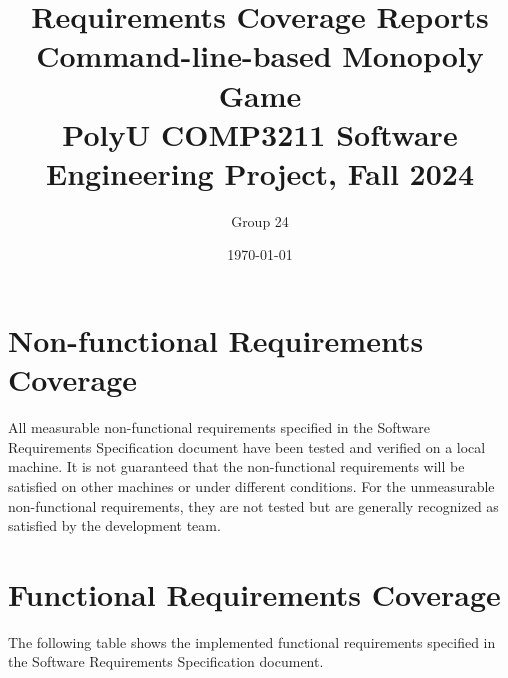 \documentclass{article}
\title{\textbf{Requirements Coverage Reports} \\ {\textbf{Command-line-based Monopoly Game}}\\ {\large PolyU COMP3211 Software Engineering Project, Fall 2024}}
\author{\large Group 24}
\date{\today}
\begin{document}
\maketitle{}

\section{Non-functional Requirements Coverage}

All measurable non-functional requirements specified in the Software Requirements Specification document have been tested and verified on a local machine.
It is not guaranteed that the non-functional requirements will be satisfied on other machines or under different conditions.
For the unmeasurable non-functional requirements, they are not tested but are generally recognized as satisfied by the development team.

\section{Functional Requirements Coverage}

The following table shows the implemented functional requirements specified in the Software Requirements Specification document.
\end{document}
